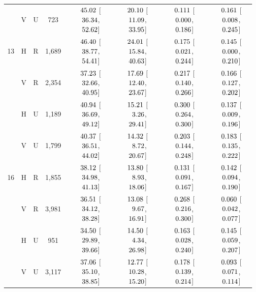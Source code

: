 \begin{landscape}
\begin{longtable}{lccccccc}
 & V & U & 723 & $\hphantom{-}45.02$ [$\hphantom{-}36.34$, $\hphantom{-}52.62$] & $\hphantom{-}20.10$ [$\hphantom{-}11.09$, $\hphantom{-}33.95$] & $\hphantom{-}0.111$ [$\hphantom{-}0.000$, $\hphantom{-}0.186$] & $\hphantom{-}0.161$ [$\hphantom{-}0.008$, $\hphantom{-}0.245$] \\
13 & H & R & 1,689 & $\hphantom{-}46.40$ [$\hphantom{-}38.77$, $\hphantom{-}54.41$] & $\hphantom{-}24.01$ [$\hphantom{-}15.84$, $\hphantom{-}40.63$] & $\hphantom{-}0.175$ [$\hphantom{-}0.021$, $\hphantom{-}0.244$] & $\hphantom{-}0.145$ [$\hphantom{-}0.000$, $\hphantom{-}0.210$] \\
 & V & R & 2,354 & $\hphantom{-}37.23$ [$\hphantom{-}32.66$, $\hphantom{-}40.95$] & $\hphantom{-}17.69$ [$\hphantom{-}12.40$, $\hphantom{-}23.67$] & $\hphantom{-}0.217$ [$\hphantom{-}0.140$, $\hphantom{-}0.266$] & $\hphantom{-}0.166$ [$\hphantom{-}0.127$, $\hphantom{-}0.202$] \\
 & H & U & 1,189 & $\hphantom{-}40.94$ [$\hphantom{-}36.69$, $\hphantom{-}49.12$] & $\hphantom{-}15.21$ [$\hphantom{-}\hphantom{0}3.26$, $\hphantom{-}29.41$] & $\hphantom{-}0.300$ [$\hphantom{-}0.264$, $\hphantom{-}0.300$] & $\hphantom{-}0.137$ [$\hphantom{-}0.009$, $\hphantom{-}0.196$] \\
 & V & U & 1,799 & $\hphantom{-}40.37$ [$\hphantom{-}36.51$, $\hphantom{-}44.02$] & $\hphantom{-}14.32$ [$\hphantom{-}\hphantom{0}8.72$, $\hphantom{-}20.67$] & $\hphantom{-}0.203$ [$\hphantom{-}0.144$, $\hphantom{-}0.248$] & $\hphantom{-}0.183$ [$\hphantom{-}0.135$, $\hphantom{-}0.222$] \\
16 & H & R & 1,855 & $\hphantom{-}38.12$ [$\hphantom{-}34.98$, $\hphantom{-}41.13$] & $\hphantom{-}13.80$ [$\hphantom{-}\hphantom{0}8.93$, $\hphantom{-}18.06$] & $\hphantom{-}0.131$ [$\hphantom{-}0.091$, $\hphantom{-}0.167$] & $\hphantom{-}0.142$ [$\hphantom{-}0.094$, $\hphantom{-}0.190$] \\
 & V & R & 3,981 & $\hphantom{-}36.51$ [$\hphantom{-}34.12$, $\hphantom{-}38.28$] & $\hphantom{-}13.08$ [$\hphantom{-}\hphantom{0}9.67$, $\hphantom{-}16.91$] & $\hphantom{-}0.268$ [$\hphantom{-}0.216$, $\hphantom{-}0.300$] & $\hphantom{-}0.060$ [$\hphantom{-}0.042$, $\hphantom{-}0.077$] \\
 & H & U & 951 & $\hphantom{-}34.50$ [$\hphantom{-}29.89$, $\hphantom{-}39.66$] & $\hphantom{-}14.50$ [$\hphantom{-}\hphantom{0}4.34$, $\hphantom{-}26.98$] & $\hphantom{-}0.163$ [$\hphantom{-}0.028$, $\hphantom{-}0.240$] & $\hphantom{-}0.145$ [$\hphantom{-}0.059$, $\hphantom{-}0.207$] \\
 & V & U & 3,117 & $\hphantom{-}37.06$ [$\hphantom{-}35.10$, $\hphantom{-}38.85$] & $\hphantom{-}12.77$ [$\hphantom{-}10.28$, $\hphantom{-}15.20$] & $\hphantom{-}0.178$ [$\hphantom{-}0.139$, $\hphantom{-}0.214$] & $\hphantom{-}0.093$ [$\hphantom{-}0.071$, $\hphantom{-}0.114$] \\
\end{longtable}
\end{landscape}
